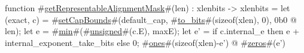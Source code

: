 function #\hyperref[sailRISCVzgetRepresentableAlignmentMask]{getRepresentableAlignmentMask}#(len) : xlenbits -> xlenbits = {
  let (exact, c) = #\hyperref[sailRISCVzsetCapBounds]{setCapBounds}#(default_cap, #\hyperref[sailRISCVztozybits]{to\_bits}#(sizeof(xlen), 0), 0b0 @ len);
  let e = #\hyperref[sailRISCVzmin]{min}#(#\hyperref[sailRISCVzunsigned]{unsigned}#(c.E), maxE);
  let e' = if c.internal_e then e + internal_exponent_take_bits else 0;
  #\hyperref[sailRISCVzones]{ones}#(sizeof(xlen)-e') @ #\hyperref[sailRISCVzzzeros]{zeros}#(e')
}
